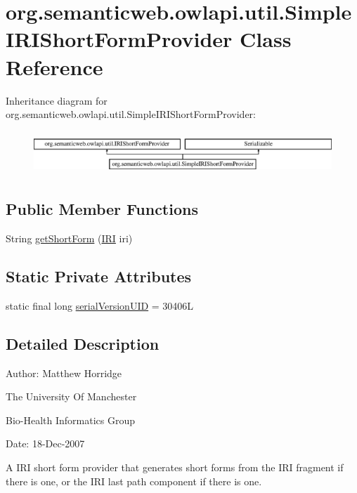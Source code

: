 \hypertarget{classorg_1_1semanticweb_1_1owlapi_1_1util_1_1_simple_i_r_i_short_form_provider}{\section{org.\-semanticweb.\-owlapi.\-util.\-Simple\-I\-R\-I\-Short\-Form\-Provider Class Reference}
\label{classorg_1_1semanticweb_1_1owlapi_1_1util_1_1_simple_i_r_i_short_form_provider}
}
Inheritance diagram for org.\-semanticweb.\-owlapi.\-util.\-Simple\-I\-R\-I\-Short\-Form\-Provider\-:\begin{figure}[H]
\begin{center}
\leavevmode
\includegraphics[height=1.656805cm]{classorg_1_1semanticweb_1_1owlapi_1_1util_1_1_simple_i_r_i_short_form_provider}
\end{center}
\end{figure}
\subsection*{Public Member Functions}
\begin{DoxyCompactItemize}
\item 
String \hyperlink{classorg_1_1semanticweb_1_1owlapi_1_1util_1_1_simple_i_r_i_short_form_provider_a19da552ddeca0f6ce1b46db642511383}{get\-Short\-Form} (\hyperlink{classorg_1_1semanticweb_1_1owlapi_1_1model_1_1_i_r_i}{I\-R\-I} iri)
\end{DoxyCompactItemize}
\subsection*{Static Private Attributes}
\begin{DoxyCompactItemize}
\item 
static final long \hyperlink{classorg_1_1semanticweb_1_1owlapi_1_1util_1_1_simple_i_r_i_short_form_provider_a12125d3d0a9a39edfc627a33d835fe58}{serial\-Version\-U\-I\-D} = 30406\-L
\end{DoxyCompactItemize}


\subsection{Detailed Description}
Author\-: Matthew Horridge\par
 The University Of Manchester\par
 Bio-\/\-Health Informatics Group\par
 Date\-: 18-\/\-Dec-\/2007\par
 \par
 A I\-R\-I short form provider that generates short forms from the I\-R\-I fragment if there is one, or the I\-R\-I last path component if there is one. 

